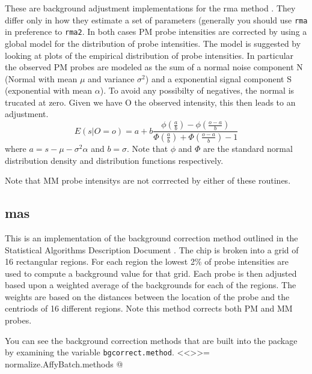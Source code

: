 These are background adjustment implementations for the rma method \cite{PMID_12582260,PMID_12925520}. They differ only in how they estimate a set of parameters (generally you should use \verb+rma+ in preference to \verb+rma2+. In both cases PM probe intensities are corrected by using a global model for the distribution of probe intensities. The model is suggested by looking at plots of the empirical distribution of probe intensities.  In particular the observed PM probes are modeled as the sum of a normal noise component N (Normal with mean $\mu$ and variance $\sigma^2$) and a exponential signal component S (exponential with mean $\alpha$). To avoid any possibilty of negatives, the normal is trucated at zero. Given we have O the observed intensity, this then leads to an adjustment.
\begin{equation*}
E\left(s \lvert O=o\right) = a + b \frac{\phi\left(\frac{a}{b}\right) - \phi\left(\frac{o-a}{b}\right)}{\Phi\left(\frac{a}{b}\right) + \Phi\left(\frac{o-a}{b}\right) - 1 }
\end{equation*}
where $a =  s- \mu - \sigma^2\alpha$ and $b = \sigma$. Note that $\phi$ and $\Phi$ are the standard normal distribution density and distribution functions respectively.

Note that MM probe intensitys are not corrrected by either of these routines.

\subsection{mas}

This is an implementation of the background correction method outlined in the Statistical Algorithms Description Document \cite{affy:tech:2002}. The chip is broken into a grid of 16 rectangular regions. For each region the lowest 2\% of probe intensities are used to compute a background value for that grid. Each probe is then adjusted based upon a weighted average of the backgrounds for each of the regions. The weights are based on the distances between the location of the probe and the centriods of 16 different regions. Note this method corrects both PM and MM probes.


You can see the background correction methods that are built into the package by examining the variable \verb+bgcorrect.method+.
<<>>=
normalize.AffyBatch.methods
@

